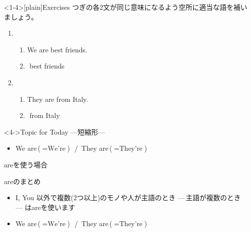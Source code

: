 \documentclass[aspectratio=169,xcolor={dvipsnames,table}]{beamer}
\begin{document}
%
%
%
\begin{frame}<1-4>[plain]{Exercises}
 つぎの各2文が同じ意味になるよう空所に適当な語を補いましょう。

\begin{enumerate}
 \item \begin{enumerate}
	\item We are best friends.
	\item {}\,\,best friends
       \end{enumerate}
 \item \begin{enumerate}
	\item They are from Italy.
	\item {}\,\,from Italy        \end{enumerate}
\end{enumerate}

\begin{exampleblock}<4->{Topic for Today ---短縮形---}
\begin{itemize}
 \item We are\,($=\text{We're}$)\,\,\,\,/\,\,\,They are\,($=\text{They're}$)
\end{itemize}
     \end{exampleblock}

\end{frame}
\begin{frame}[plain]{areを使う場合}

\begin{block}{areのまとめ}
\begin{itemize}
 \item   I, You 以外で複数(2つ以上)のモノや人が主語のとき\,\,---\,主語が複数のとき\,---\,\,はareを使います
 \item We are\,($=\text{We're}$)\,\,\,\,/\,\,\,They are\,($=\text{They're}$)
\end{itemize}  
     \end{block}


\end{frame}
\end{document}
